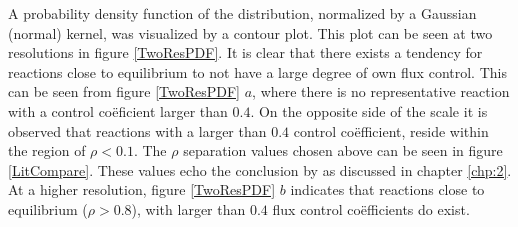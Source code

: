 A probability density function of the distribution, normalized by a Gaussian (normal) kernel, was visualized by a contour plot. This plot can be seen at two resolutions in figure \ref{TwoResPDF}. It is clear that there exists a tendency for reactions close to equilibrium to not have a large degree of own flux control. This can be seen from figure \ref{TwoResPDF} $a$, where there is no representative reaction with a control co\"eficient larger than $0.4$. On the opposite side of the scale it is observed that reactions with a larger than $0.4$ control co\"efficient, reside within the region of $\rho < 0.1$. The $\rho$ separation values chosen above can be seen in figure \ref{LitCompare}. These values echo the conclusion by \citeauthor{Rohwer2009} as discussed in chapter \ref{chp:2}. At a higher resolution, figure \ref{TwoResPDF} $b$ indicates that reactions close to equilibrium ($\rho > 0.8$), with larger than $0.4$ flux control co\"efficients do exist. 

